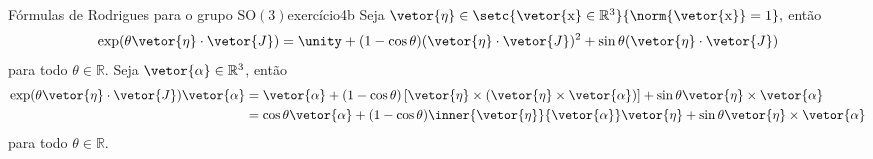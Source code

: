 \begin{proposition}{Fórmulas de Rodrigues para o grupo \(\mathrm{SO}(3)\)}{exercício4b}
    Seja \(\vetor{\eta} \in \setc{\vetor{\mathrm{x}}\in \mathbb{R}^3}{\norm{\vetor{\mathrm{x}}} = 1},\) então
    \begin{equation*}
        \exp(\theta \vetor{\eta}\cdot \vetor{J}) = \unity + (1 - \cos\theta) (\vetor{\eta}\cdot \vetor{J})^2 + \sin\theta (\vetor{\eta}\cdot \vetor{J})
    \end{equation*}
    para todo \(\theta \in \mathbb{R}\). Seja \(\vetor{\alpha} \in \mathbb{R}^3\), então
    \begin{align*}
        \exp(\theta \vetor{\eta}\cdot \vetor{J})\vetor{\alpha} &= \vetor{\alpha} + (1 - \cos\theta) \left[\vetor{\eta} \times (\vetor{\eta} \times \vetor{\alpha})\right] + \sin\theta \vetor{\eta}\times \vetor{\alpha}\\&= \cos\theta\vetor{\alpha} + (1 - \cos\theta) \inner{\vetor{\eta}}{\vetor{\alpha}}\vetor{\eta} + \sin\theta \vetor{\eta}\times \vetor{\alpha}
    \end{align*}
    para todo \(\theta \in \mathbb{R}\).
\end{proposition}
